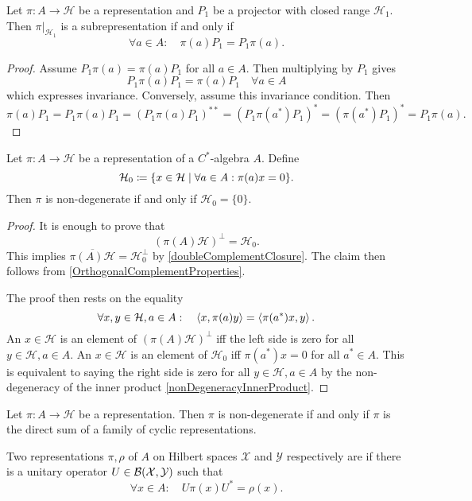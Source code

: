 \begin{lemma}
Let $\pi: A\to\mathcal{H}$ be a representation and $P_1$ be a projector with closed range $\mathcal{H}_1$. Then $\pi|_{\mathcal{H}_1}$ is a subrepresentation \textup{if and only if}
\[ \forall a\in A: \quad \pi(a)P_1 = P_1\pi(a).  \]
\end{lemma}
\begin{proof}
Assume $P_1\pi(a) = \pi(a)P_1$ for all $a\in A$. Then multiplying by $P_1$ gives
\[ P_1\pi(a)P_1 = \pi(a)P_1 \quad \forall a\in A \]
which expresses invariance. Conversely, assume this invariance condition. Then
\[ \pi(a)P_1 = P_1\pi(a)P_1 = (P_1\pi(a)P_1)^{**} = (P_1\pi(a^*)P_1)^{*} = (\pi(a^*)P_1)^* = P_1\pi(a). \]
\end{proof}

\begin{lemma} \label{nonDegeneracyAlgebraRepresentation}
Let $\pi:A\to \mathcal{H}$ be a representation of a $C^*$-algebra $A$. Define
\[ \mathcal{H}_0 \defeq \setbuilder{x\in\mathcal{H}}{\forall a\in A: \pi(a)x = 0}. \]
Then $\pi$ is non-degenerate \textup{if and only if} $\mathcal{H}_0 = \{0\}$.
\end{lemma}
\begin{proof}
It is enough to prove that
\[ (\pi(A)\mathcal{H})^\perp = \mathcal{H}_0. \]
This implies $\overline{\pi(A)\mathcal{H}} = \mathcal{H}_0^\perp$ by \ref{doubleComplementClosure}. The claim then follows from \ref{OrthogonalComplementProperties}.

The proof then rests on the equality
\[ \forall x,y\in \mathcal{H}, a\in A: \quad \left\langle x,\pi(a)y \right\rangle = \left\langle \pi(a^*)x,y \right\rangle. \]
An $x\in\mathcal{H}$ is an element of $(\pi(A)\mathcal{H})^\perp$ iff the left side is zero for all $y\in\mathcal{H},a\in A$. An $x\in\mathcal{H}$ is an element of $\mathcal{H}_0$ iff $\pi(a^*)x = 0$ for all $a^*\in A$. This is equivalent to saying the right side is zero for all $y\in\mathcal{H},a\in A$ by the non-degeneracy of the inner product \ref{nonDegeneracyInnerProduct}.
\end{proof}

\begin{proposition}
Let $\pi:A\to \mathcal{H}$ be a representation. Then $\pi$ is non-degenerate \textup{if and only if} $\pi$ is the direct sum of a family of cyclic representations.
\end{proposition}

\begin{definition}
Two representations $\pi,\rho$ of $A$ on Hilbert spaces $\mathcal{X}$ and $\mathcal{Y}$ respectively are  if there is a unitary operator $U\in\operatorname{\mathcal{B}}(\mathcal{X}, \mathcal{Y})$ such that
\[ \forall x\in A: \quad U\pi(x)U^* = \rho(x). \]
\end{definition}

